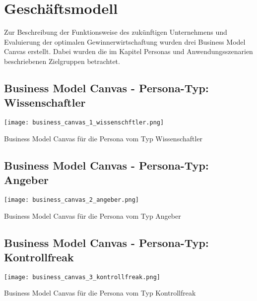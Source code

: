 	\newpage
   	\section{Geschäftsmodell}
   	Zur Beschreibung der Funktionsweise des zukünftigen Unternehmens und Evaluierung der optimalen Gewinnerwirtschaftung wurden drei Business Model Canvas erstellt. Dabei wurden die im Kapitel Personas und Anwendungsszenarien beschriebenen Zielgruppen betrachtet.

   	\begin{landscape}
	\newpage
	\subsection{Business Model Canvas - Persona-Typ: Wissenschaftler}
   	\begin{table}[h!]
		\begin{center}
			\texttt{[image: business\_canvas\_1\_wissenschftler.png]}
		\end{center}
		\caption[Business Model Canvas - Persona-Typ: Wissenschaftler]{Business Model Canvas für die Persona vom Typ Wissenschaftler}
		\label{fig:business_model_1}
	\end{table}
	
	\newpage
   	\subsection{Business Model Canvas - Persona-Typ: Angeber}
   	\begin{table}[h!]
		\begin{center}
			\texttt{[image: business\_canvas\_2\_angeber.png]}
		\end{center}
		\caption[Business Model Canvas - Persona-Typ: Angeber]{Business Model Canvas für die Persona vom Typ Angeber}
		\label{fig:business_model_2}
	\end{table}
	
	\newpage
	\subsection{Business Model Canvas - Persona-Typ: Kontrollfreak}
   	\begin{table}[h!]
		\begin{center}
			\texttt{[image: business\_canvas\_3\_kontrollfreak.png]}
		\end{center}
		\caption[Business Model Canvas - Persona-Typ: Kontrollfreak]{Business Model Canvas für die Persona vom Typ Kontrollfreak}
		\label{fig:business_model_3}
	\end{table}


\end{landscape}
